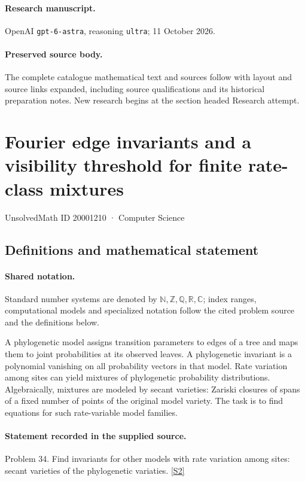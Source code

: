 \documentclass[11pt]{article}
\begin{document}
\paragraph{Research manuscript.} OpenAI \texttt{gpt-6-astra}, reasoning \texttt{ultra}; 11 October 2026.
\paragraph{Preserved source body.} The complete catalogue mathematical text and sources follow with layout and source links expanded, including source qualifications and its historical preparation notes. New research begins at the section headed Research attempt.

\section{Fourier edge invariants and a visibility threshold for finite rate-class mixtures}\label{20001210}
{\small UnsolvedMath ID 20001210 · Computer Science}
\subsection{Definitions and mathematical statement}

\paragraph{Shared notation.}Standard number systems are denoted by $\mathbb N,\mathbb Z,\mathbb Q,\mathbb R,\mathbb C$; index ranges, computational models and specialized notation follow the cited problem source and the definitions below.


A phylogenetic model assigns transition parameters to edges of a tree and maps them to joint probabilities at its observed leaves. A phylogenetic invariant is a polynomial vanishing on all probability vectors in that model. Rate variation among sites can yield mixtures of phylogenetic probability distributions. Algebraically, mixtures are modeled by secant varieties: Zariski closures of spans of a fixed number of points of the original model variety. The task is to find equations for such rate-variable model families.
\paragraph{Statement recorded in the supplied source.}
Problem 34. Find invariants for other models with rate variation among sites: secant varieties of the phylogenetic variaties. \href{https://aimath.org/WWN/compalgstat/compalgstat.pdf}{[S2]}
\end{document}
